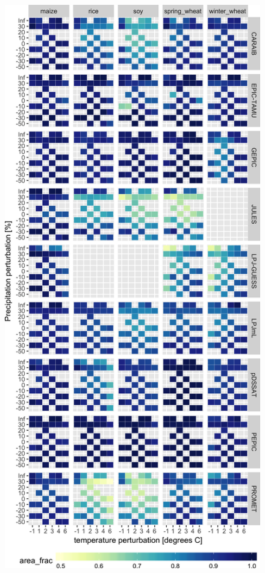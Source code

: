 \documentclass[10pt]{article}
\begin{document}
\begin{figure}[h!]
\centering
\begin{minipage}{.45\textwidth}
\centering
\includegraphics[width=\textwidth]{s_error_360_total.png}\\

\end{minipage}
\end{figure}
\end{document}
